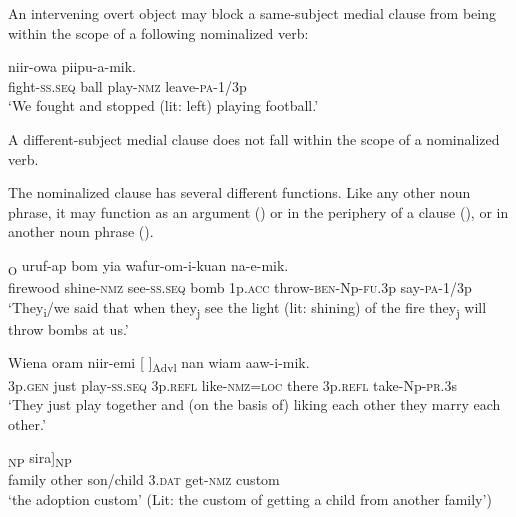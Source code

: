 An intervening overt object may block a same-subject medial clause from being within the scope of a following nominalized verb:

\ea%
\label{ex:x1886}
\gll [Irak-ep]    niir-owa  piipu-a-mik. \\
     fight-\textsc{ss}.\textsc{seq}  ball  play-\textsc{nmz}  leave-\textsc{pa}-1/3p \\
\glt `We fought and stopped (lit: left) playing football.'
\z

A different-subject medial clause does not fall within the scope of a nominalized verb. 

The nominalized clause has several different functions. Like any other noun phrase, it may function as an argument () or in the periphery of a clause (), or in another noun phrase ().

\ea%
\label{ex:x1230}
\textsubscript{O}  uruf-ap  bom  yia wafur-om-i-kuan  na-e-mik. \\
     firewood  shine-\textsc{nmz}  see-\textsc{ss}.\textsc{seq}  bomb  1p.\textsc{acc} throw-\textsc{ben}-Np-\textsc{fu}.3p  say-\textsc{pa}-1/3p \\
\glt `They\textsubscript{i}/we said that when they\textsubscript{j} see the light (lit: shining) of the fire they\textsubscript{j} will throw bombs at us.'
\z

\ea%
\label{ex:x1241}
\gll Wiena  oram  niir-emi  [ \textstyleEmphasizedVernacularWords{-}]\textsubscript{Advl} nan  wiam  aaw-i-mik. \\
     3p.\textsc{gen}  just  play-\textsc{ss}.\textsc{seq}  3p.\textsc{refl}  like-\textsc{nmz}=\textsc{loc} there  3p.\textsc{refl}  take-Np-\textsc{pr}.3s \\
\glt `They just play together and (on the basis of) liking each other they marry each other.'
\z

\ea%
\label{ex:x1229}
\gll [[\textstyleEmphasizedVernacularWords{garanga}  \textstyleEmphasizedVernacularWords{oko} \textstyleEmphasizedVernacularWords{muuka} \textstyleEmphasizedVernacularWords{wiar} \textstyleEmphasizedVernacularWords{aaw-owa}]\textsubscript{NP}  sira]\textsubscript{NP} \\
     family  other  son/child  3.\textsc{dat}  get-\textsc{nmz}  custom \\
\glt `the adoption custom' (Lit: the custom of getting a child from another family')
\z

